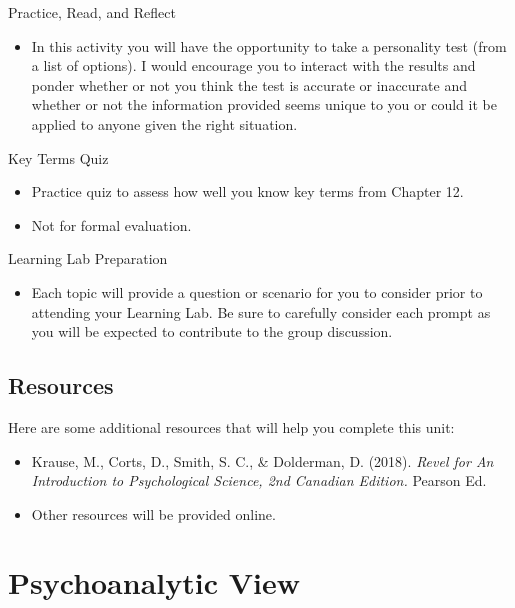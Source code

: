 \documentclass[
]{book}
\providecommand{\tightlist}{%
  \setlength{\itemsep}{0pt}\setlength{\parskip}{0pt}}
\begin{document}
\begin{reflect}
{Practice, Read, and Reflect}

\begin{itemize}
\tightlist
\item
  In this activity you will have the opportunity to take a personality test (from a list of options). I would encourage you to interact with the results and ponder whether or not you think the test is accurate or inaccurate and whether or not the information provided seems unique to you or could it be applied to anyone given the right situation.
\end{itemize}

{Key Terms Quiz}

\begin{itemize}
\tightlist
\item
  Practice quiz to assess how well you know key terms from Chapter 12.\\
\item
  Not for formal evaluation.
\end{itemize}

{Learning Lab Preparation}

\begin{itemize}
\tightlist
\item
  Each topic will provide a question or scenario for you to consider prior to attending your Learning Lab. Be sure to carefully consider each prompt as you will be expected to contribute to the group discussion.
\end{itemize}
\end{reflect}

\hypertarget{resources-5}{%
\subsection*{Resources}\label{resources-5}}

Here are some additional resources that will help you complete this unit:

\begin{itemize}
\tightlist
\item
  Krause, M., Corts, D., Smith, S. C., \& Dolderman, D. (2018). \emph{Revel for An Introduction to Psychological Science, 2nd Canadian Edition.} Pearson Ed.\\
\item
  Other resources will be provided online.
\end{itemize}

\hypertarget{psychoanalytic-view}{%
\section{Psychoanalytic View}\label{psychoanalytic-view}}
\end{document}
